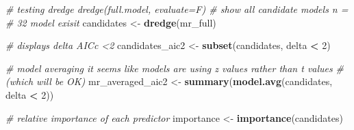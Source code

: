 \documentclass[
]{article}
\newenvironment{Shaded}{\begin{snugshade}}{\end{snugshade}}
\newcommand{\CommentTok}[1]{\textcolor[rgb]{0.56,0.35,0.01}{\textit{#1}}}
\newcommand{\DecValTok}[1]{\textcolor[rgb]{0.00,0.00,0.81}{#1}}
\newcommand{\KeywordTok}[1]{\textcolor[rgb]{0.13,0.29,0.53}{\textbf{#1}}}
\newcommand{\NormalTok}[1]{#1}
\newcommand{\OperatorTok}[1]{\textcolor[rgb]{0.81,0.36,0.00}{\textbf{#1}}}
\newcommand{\StringTok}[1]{\textcolor[rgb]{0.31,0.60,0.02}{#1}}
\begin{document}
\begin{Shaded}
\begin{Highlighting}[]
\CommentTok{# testing dredge dredge(full.model, evaluate=F) # show all candidate models n =}
\CommentTok{# 32 model exisit}
\NormalTok{candidates <-}\StringTok{ }\KeywordTok{dredge}\NormalTok{(mr_full)}

\CommentTok{# displays delta AICc <2}
\NormalTok{candidates_aic2 <-}\StringTok{ }\KeywordTok{subset}\NormalTok{(candidates, delta }\OperatorTok{<}\StringTok{ }\DecValTok{2}\NormalTok{)}

\CommentTok{# model averaging it seems like models are using z values rather than t values}
\CommentTok{# (which will be OK)}
\NormalTok{mr_averaged_aic2 <-}\StringTok{ }\KeywordTok{summary}\NormalTok{(}\KeywordTok{model.avg}\NormalTok{(candidates, delta }\OperatorTok{<}\StringTok{ }\DecValTok{2}\NormalTok{))}

\CommentTok{# relative importance of each predictor}
\NormalTok{importance <-}\StringTok{ }\KeywordTok{importance}\NormalTok{(candidates)}


\end{Highlighting}
\end{Shaded}
\end{document}
